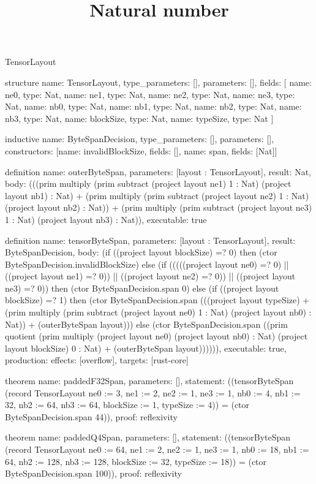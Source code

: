 \begin{lexlean}{TensorLayout}
\title{Natural number}
\begin{semanticmodule}
structure{
  name: TensorLayout,
  type_parameters: [],
  parameters: [],
  fields: [
    {name: ne0, type: Nat},
    {name: ne1, type: Nat},
    {name: ne2, type: Nat},
    {name: ne3, type: Nat},
    {name: nb0, type: Nat},
    {name: nb1, type: Nat},
    {name: nb2, type: Nat},
    {name: nb3, type: Nat},
    {name: blockSize, type: Nat},
    {name: typeSize, type: Nat}
  ]
}

inductive{
  name: ByteSpanDecision,
  type_parameters: [],
  parameters: [],
  constructors: [{name: invalidBlockSize, fields: []}, {name: span, fields: [Nat]}]
}

definition{
  name: outerByteSpan,
  parameters: [layout : TensorLayout],
  result: Nat,
  body: (((prim multiply (prim subtract (project layout ne1) 1 : Nat) (project layout nb1) : Nat) + (prim multiply (prim subtract (project layout ne2) 1 : Nat) (project layout nb2) : Nat)) + (prim multiply (prim subtract (project layout ne3) 1 : Nat) (project layout nb3) : Nat)),
  executable: true
}

definition{
  name: tensorByteSpan,
  parameters: [layout : TensorLayout],
  result: ByteSpanDecision,
  body: (if ((project layout blockSize) =? 0) then (ctor ByteSpanDecision.invalidBlockSize) else (if (((((project layout ne0) =? 0) || ((project layout ne1) =? 0)) || ((project layout ne2) =? 0)) || ((project layout ne3) =? 0)) then (ctor ByteSpanDecision.span 0) else (if ((project layout blockSize) =? 1) then (ctor ByteSpanDecision.span (((project layout typeSize) + (prim multiply (prim subtract (project layout ne0) 1 : Nat) (project layout nb0) : Nat)) + (outerByteSpan layout))) else (ctor ByteSpanDecision.span ((prim quotient (prim multiply (project layout ne0) (project layout nb0) : Nat) (project layout blockSize) 0 : Nat) + (outerByteSpan layout)))))),
  executable: true,
  production: {effects: [overflow], targets: [rust-core]}
}

theorem{
  name: paddedF32Span,
  parameters: [],
  statement: ((tensorByteSpan (record TensorLayout {ne0 := 3, ne1 := 2, ne2 := 1, ne3 := 1, nb0 := 4, nb1 := 32, nb2 := 64, nb3 := 64, blockSize := 1, typeSize := 4})) = (ctor ByteSpanDecision.span 44)),
  proof: reflexivity{}
}

theorem{
  name: paddedQ4Span,
  parameters: [],
  statement: ((tensorByteSpan (record TensorLayout {ne0 := 64, ne1 := 2, ne2 := 1, ne3 := 1, nb0 := 18, nb1 := 64, nb2 := 128, nb3 := 128, blockSize := 32, typeSize := 18})) = (ctor ByteSpanDecision.span 100)),
  proof: reflexivity{}
}
\end{semanticmodule}
\end{lexlean}
